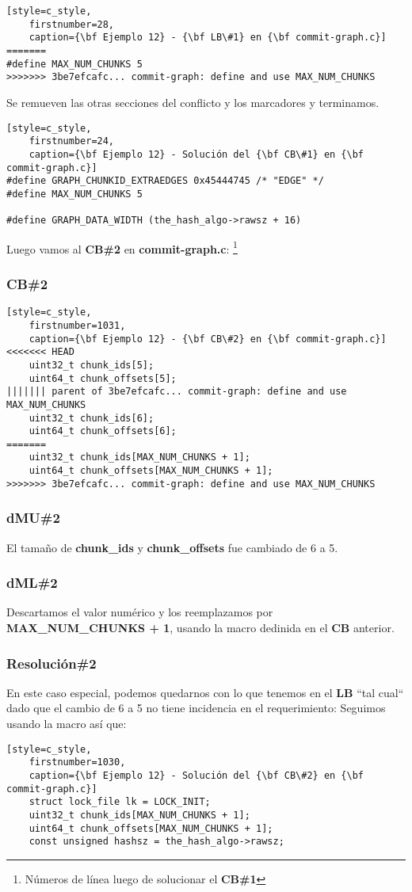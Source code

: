 \begin{lstlisting}[style=c_style,
	firstnumber=28,
	caption={\bf Ejemplo 12} - {\bf LB\#1} en {\bf commit-graph.c}]
=======
#define MAX_NUM_CHUNKS 5
>>>>>>> 3be7efcafc... commit-graph: define and use MAX_NUM_CHUNKS
\end{lstlisting}

Se remueven las otras secciones del conflicto y los marcadores y terminamos.

\begin{lstlisting}[style=c_style,
	firstnumber=24,
	caption={\bf Ejemplo 12} - Solución del {\bf CB\#1} en {\bf commit-graph.c}]
#define GRAPH_CHUNKID_EXTRAEDGES 0x45444745 /* "EDGE" */
#define MAX_NUM_CHUNKS 5

#define GRAPH_DATA_WIDTH (the_hash_algo->rawsz + 16)
\end{lstlisting}

Luego vamos al {\bf CB\#2} en {\bf commit-graph.c}:
\footnote{Números de línea luego de solucionar el {\bf CB\#1}}
\subsubsection{CB\#2}
\begin{lstlisting}[style=c_style,
	firstnumber=1031,
	caption={\bf Ejemplo 12} - {\bf CB\#2} en {\bf commit-graph.c}]
<<<<<<< HEAD
	uint32_t chunk_ids[5];
	uint64_t chunk_offsets[5];
||||||| parent of 3be7efcafc... commit-graph: define and use MAX_NUM_CHUNKS
	uint32_t chunk_ids[6];
	uint64_t chunk_offsets[6];
=======
	uint32_t chunk_ids[MAX_NUM_CHUNKS + 1];
	uint64_t chunk_offsets[MAX_NUM_CHUNKS + 1];
>>>>>>> 3be7efcafc... commit-graph: define and use MAX_NUM_CHUNKS
\end{lstlisting}

\subsubsection{dMU\#2}
El tamaño de {\bf chunk\_ids} y {\bf chunk\_offsets} fue cambiado de 6 a 5.

\subsubsection{dML\#2}
Descartamos el valor numérico y los reemplazamos por {\bf MAX\_NUM\_CHUNKS + 1}, usando la macro dedinida en el {\bf CB} anterior.

\subsubsection{Resolución\#2}
En este caso especial, podemos quedarnos con lo que tenemos en el {\bf LB} ``tal cual`` dado que el cambio de 6 a 5
no tiene incidencia en el requerimiento: Seguimos usando la macro así que:
\begin{lstlisting}[style=c_style,
	firstnumber=1030,
	caption={\bf Ejemplo 12} - Solución del {\bf CB\#2} en {\bf commit-graph.c}]
	struct lock_file lk = LOCK_INIT;
	uint32_t chunk_ids[MAX_NUM_CHUNKS + 1];
	uint64_t chunk_offsets[MAX_NUM_CHUNKS + 1];
	const unsigned hashsz = the_hash_algo->rawsz;
\end{lstlisting}

